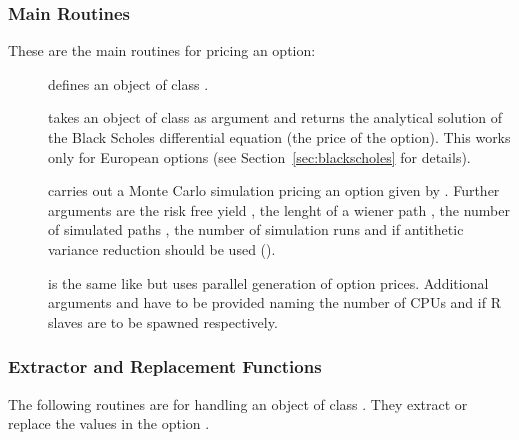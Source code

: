 \begin{Example}
\subsubsection{Main Routines}

These are the main routines for pricing an option:

\begin{description}
\item[] defines an object
  of class . 
\item[] takes an object of class
   as argument and returns the analytical solution of
  the Black Scholes differential equation (the price of the
  option). This works only for European options (see
  Section~\ref{sec:blackscholes} for details).
\item[] carries out a Monte Carlo simulation pricing
  an option given by . Further arguments are the risk free
  yield , the lenght of a wiener path , the number of
  simulated paths , the number of simulation runs
   and if antithetic variance reduction should be
  used ().
\item[] is the same
  like  but uses parallel generation of
  option prices. Additional arguments  and
   have to be provided naming the number of CPUs
  and if R slaves are to be spawned respectively.
\end{description}

\subsubsection{Extractor and Replacement Functions}

The following routines are for handling an object of class
. They
extract or replace the values in the option .

\end{Example}

